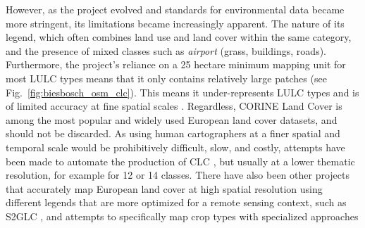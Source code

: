         However, as the project evolved and standards for environmental data became more stringent, its limitations became increasingly apparent. 
        The nature of its legend, which often combines land use and land cover within the same category, and the presence of mixed classes such as \textit{airport} (grass, buildings, roads).
        Furthermore, the project's reliance on a 25 hectare minimum mapping unit for most LULC types means that it only contains relatively large patches (see Fig.\@~\ref{fig:biesbosch_osm_clc}). This means it under-represents LULC types and is of limited accuracy at fine spatial scales \citep{buttner2014corine,aune2021content, pflugmacher2019mapping}. Regardless, CORINE Land Cover is among the most popular and widely used European land cover datasets, and should not be discarded. As using human cartographers at a finer spatial and temporal scale would be prohibitively difficult, slow, and costly, attempts have been made to automate the production of CLC \citep{buttner2014corine}, but usually at a lower thematic resolution, for example for 12 \citep{pflugmacher2019mapping} or 14 \citep{bhugra2022rapidai4eo} classes. There have also been other projects that accurately map European land cover at high spatial resolution using different legends that are more optimized for a remote sensing context, such as S2GLC \citep{malinowski2020}, and attempts to specifically map crop types with specialized approaches \citep{dandrimont2021parcel,luo2022developing}


